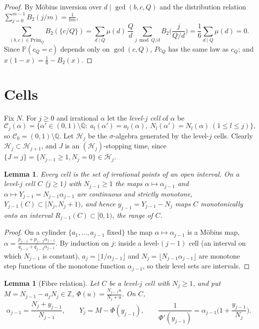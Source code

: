 \documentclass[11pt]{amsart}
\newtheorem{lemma}[theorem]{Lemma}
\theoremstyle{definition}
\numberwithin{equation}{section}
\newcommand{\Z}{\mathbb{Z}}
\newcommand{\Prob}{\mathbb{P}}
\newcommand{\cH}{\mathcal{H}}
\newcommand{\cC}{\mathcal{C}}
\newcommand{\fr}[1]{\{#1\}}
\newcommand{\Prim}{\mathrm{Prim}}
\begin{document}
\begin{proof}
By M\"obius inversion over $d\mid\gcd(b,c,Q)$ and the distribution relation $\sum_{j=0}^{m-1}B_2(j/m)=\frac1{6m}$,
\[
\sum_{(b,c)\in\Prim_Q}B_2(\fr{c/Q})=\sum_{d\mid Q}\mu(d)\,\frac Qd\sum_{j\bmod Q/d}B_2\Big(\frac{j}{Q/d}\Big)=\frac16\sum_{d\mid Q}\mu(d)=0 .
\]
Since $\Prob(c_Q=c)$ depends only on $\gcd(c,Q)$, $Pc_Q$ has the same law as $c_Q$; and $x(1-x)=\frac16-B_2(x)$.
\end{proof}
\section{Cells}\label{sec:cells}

Fix $N$. For $j\ge0$ and irrational $\alpha$ let the \emph{level-$j$ cell} of $\alpha$ be
\[
\cC_j(\alpha)=\{\alpha'\in(0,1)\setminus\mathbb Q:\ a_l(\alpha')=a_l(\alpha),\ N_l(\alpha')=N_l(\alpha)\ (1\le l\le j)\},
\]
so $\cC_0=(0,1)\setminus\mathbb Q$. Let $\cH_j$ be the $\sigma$-algebra generated by the level-$j$ cells. Clearly
$\cH_j\subset\cH_{j+1}$, and $J$ is an $(\cH_j)$-stopping time, since $\{J=j\}=\{N_{j-1}\ge1,N_j=0\}\in\cH_j$.

\begin{lemma}\label{lem:cells}
Every cell is the set of irrational points of an open interval. On a level-$j$ cell $C$ ($j\ge1$) with $N_{j-1}\ge1$ the maps
$\alpha\mapsto\alpha_{j-1}$ and $\alpha\mapsto Y_{j-1}=N_{j-1}\alpha_{j-1}$ are continuous and strictly monotone,
$Y_{j-1}(C)\subset[N_j,N_j+1)$, and hence $y_{j-1}=Y_{j-1}-N_j$ maps $C$ monotonically onto an interval
$R_{j-1}(C)\subset[0,1)$, the \emph{range} of $C$.
\end{lemma}

\begin{proof}
On a cylinder $\{a_1,\dots,a_{j-1}\text{ fixed}\}$ the map $\alpha\mapsto\alpha_{j-1}$ is a M\"obius map,
$\alpha=\frac{p_{j-1}+p_{j-2}\alpha_{j-1}}{q_{j-1}+q_{j-2}\alpha_{j-1}}$. By induction on $j$: inside a level-$(j-1)$ cell
(an interval on which $N_{j-1}$ is constant), $a_j=\lfloor1/\alpha_{j-1}\rfloor$ and $N_j=\lfloor N_{j-1}\alpha_{j-1}\rfloor$
are monotone step functions of the monotone function $\alpha_{j-1}$, so their level sets are intervals.
\end{proof}

\begin{lemma}[Fibre relation]\label{lem:fibre}
Let $C$ be a level-$j$ cell with $N_j\ge1$, and put $M=N_{j-1}-a_jN_j\in\Z$, $\Phi(u)=\frac{N_{j-1}u}{N_j+u}$. On $C$,
\[
\alpha_{j-1}=\frac{N_j+y_{j-1}}{N_{j-1}},\qquad Y_j=M-\Phi(y_{j-1}),\qquad
\frac{1}{\Phi'(y_{j-1})}=\alpha_{j-1}\Big(1+\frac{y_{j-1}}{N_j}\Big).
\]
\end{lemma}
\end{document}
